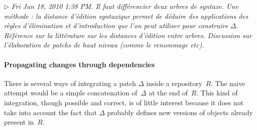 \documentclass{article}
\newcommand{\remtext}[1]{\textcolor{bwgreen}{$\triangleright$ \textsl{#1}}}
\begin{document}

\remtext{Fri Jun 18, 2010 1:38 PM. Il faut différencier deux arbres de
  syntaxe. Une méthode : la distance d'édition syntaxique permet de
  déduire des applications des règles d'élimination et d'introduction
  que l'on peut utiliser pour construire $\Delta$. Référence sur la
  littérature sur les distances d'édition entre arbres. Discussion sur
  l'élaboration de patchs de haut niveau (comme le renommage etc). }

\paragraph{Propagating changes through dependencies}
\-

There is several ways of integrating a patch $\Delta$ inside a
repository~$R$.  The naive attempt would be a simple concatenation
of~$\Delta$ at the end of~$R$.  This kind of integration, though
possible and correct, is of little interest because it does not take
into account the fact that $\Delta$ probably defines new versions of
objects already present in~$R$.
\end{document}
